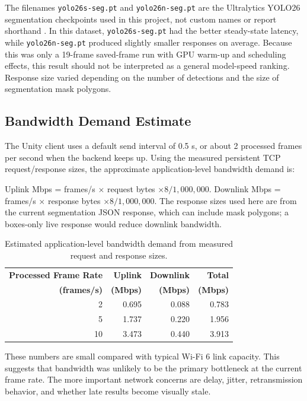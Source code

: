 \documentclass[11pt]{article}
\begin{document}
The filenames \texttt{yolo26s-seg.pt} and \texttt{yolo26n-seg.pt} are the Ultralytics YOLO26 segmentation checkpoints used in this project, not custom names or report shorthand \cite{ultralytics-yolo26}. In this dataset, \texttt{yolo26s-seg.pt} had the better steady-state latency, while \texttt{yolo26n-seg.pt} produced slightly smaller responses on average. Because this was only a 19-frame saved-frame run with GPU warm-up and scheduling effects, this result should not be interpreted as a general model-speed ranking. Response size varied depending on the number of detections and the size of segmentation mask polygons.

\subsection{Bandwidth Demand Estimate}

The Unity client uses a default send interval of 0.5 s, or about 2 processed frames per second when the backend keeps up. Using the measured persistent TCP request/response sizes, the approximate application-level bandwidth demand is:

Uplink Mbps = frames/s \(\times\) request bytes \(\times 8 / 1{,}000{,}000\). Downlink Mbps = frames/s \(\times\) response bytes \(\times 8 / 1{,}000{,}000\). The response sizes used here are from the current segmentation JSON response, which can include mask polygons; a boxes-only live response would reduce downlink bandwidth.

\begin{table}[H]
\centering
\begin{tabular}{rrrr}
\toprule
\textbf{Processed Frame Rate} & \textbf{Uplink} & \textbf{Downlink} & \textbf{Total} \\
\textbf{(frames/s)} & \textbf{(Mbps)} & \textbf{(Mbps)} & \textbf{(Mbps)} \\
\midrule
2 & 0.695 & 0.088 & 0.783 \\
5 & 1.737 & 0.220 & 1.956 \\
10 & 3.473 & 0.440 & 3.913 \\
\bottomrule
\end{tabular}
\caption{Estimated application-level bandwidth demand from measured request and response sizes.}
\end{table}

These numbers are small compared with typical Wi-Fi 6 link capacity. This suggests that bandwidth was unlikely to be the primary bottleneck at the current frame rate. The more important network concerns are delay, jitter, retransmission behavior, and whether late results become visually stale.
\end{document}
